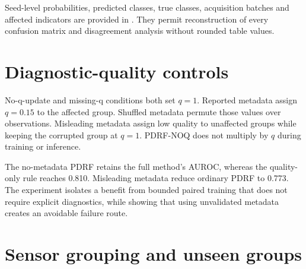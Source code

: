 \documentclass[10pt]{article}
\begin{document}
\begin{table}[ht]
\centering
\caption{Results reported separately for acquisition batches 8, 9 and 10. Values are means across 10 seeds.}
\resizebox{0.72\textwidth}{!}{}
\end{table}

\begin{table}[p]
\centering
\caption{Per-class chemical-array performance under the fixed silent fault. Values are means across 10 seeds. Classes correspond to the six gases in the repository encoding.}
\resizebox{0.76\textwidth}{!}{}
\end{table}

Seed-level probabilities, predicted classes, true classes, acquisition batches and affected indicators are provided in . They permit reconstruction of every confusion matrix and disagreement analysis without rounded table values.

\section{Diagnostic-quality controls}

No-q-update and missing-q conditions both set $q=1$. Reported metadata assign $q=0.15$ to the affected group. Shuffled metadata permute those values over observations. Misleading metadata assign low quality to unaffected groups while keeping the corrupted group at $q=1$. PDRF-NOQ does not multiply by $q$ during training or inference.

\begin{table}[ht]
\centering
\caption{Diagnostic-quality controls under the fixed chemical-array fault.}
\resizebox{0.66\textwidth}{!}{}
\end{table}

The no-metadata PDRF retains the full method's AUROC, whereas the quality-only rule reaches 0.810. Misleading metadata reduce ordinary PDRF to 0.773. The experiment isolates a benefit from bounded paired training that does not require explicit diagnostics, while showing that using unvalidated metadata creates an avoidable failure route.

\section{Sensor grouping and unseen groups}
\end{document}
